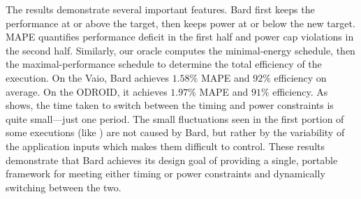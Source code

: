 The results demonstrate several important features.
Bard first keeps the performance at or above the target, then keeps power at or below the new target.
MAPE quantifies performance deficit in the first half and power cap violations in the second half.
Similarly, our oracle computes the minimal-energy schedule, then the maximal-performance schedule to determine the total efficiency of the execution.
On the Vaio, Bard achieves $1.58\%$ MAPE and $92\%$ efficiency on average.
On the ODROID, it achieves $1.97\%$ MAPE and $91\%$ efficiency.
As  shows, the time taken to switch between the timing and power constraints is quite small---just one period.
The small fluctuations seen in the first portion of some executions (like ) are not caused by Bard, but rather by the variability of the application inputs which makes them difficult to control.
These results demonstrate that Bard achieves its design goal of providing a single, portable framework for meeting either timing or power constraints and dynamically switching between the two.
